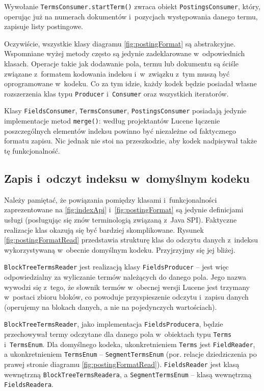 Wywołanie \texttt{TermsConsumer.startTerm()} zwraca obiekt \texttt{PostingsConsumer}, który, operując już na numerach dokumentów i~pozycjach występowania danego termu, zapisuje listy postingowe.

Oczywiście, wszystkie klasy diagramu \ref{fig:postingFormat} są abstrakcyjne. Wspomniane wyżej metody często są jedynie zadeklarowane w~odpowiednich klasach. Operacje takie jak dodawanie pola, termu lub dokumentu są ściśle związane z~formatem kodowania indeksu i~w~związku z~tym muszą być oprogramowane w~kodeku. Co za tym idzie, każdy kodek będzie posiadał własne rozszerzenia klas typu \texttt{Producer} i~\texttt{Consumer} oraz wszystkich iteratorów. 

Klasy \texttt{FieldsConsumer}, \texttt{TermsConsumer}, \texttt{PostingsConsumer} posiadają jedynie implementacje metod \texttt{merge()}: według projektantów Lucene łączenie poszczególnych elementów indeksu powinno być niezależne od faktycznego formatu zapisu. Nic jednak nie stoi na przeszkodzie, aby kodek nadpisywał także tę funkcjonalność.

\subsection{Zapis i~odczyt indeksu w~domyślnym kodeku}

Należy pamiętać, że powiązania pomiędzy klasami i~funkcjonalności zaprezentowane na \ref{fig:indexApi} i~\ref{fig:postingFormat} są jedynie definicjami usługi (posługując się znów terminologią związaną z~Java SPI). Faktyczne realizacje klas okazują się być bardziej skomplikowane. Rysunek \ref{fig:postingFormatRead} przedstawia strukturę klas do odczytu danych z~indeksu wykorzystywaną w~obecnie domyślnym kodeku. Przyjrzyjmy się jej bliżej.

\texttt{BlockTreeTermsReader} jest realizacją klasy \texttt{FieldsProducer} -- jest więc odpowiedzialny za wyliczanie termów należących do danego pola. Jego nazwa wywodzi się z~tego, że słownik termów w~obecnej wersji Lucene jest trzymany w~postaci zbioru bloków, co powoduje przyspieszenie odczytu i~zapisu danych (operujemy na blokach danych, a nie na pojedynczych wartościach). 

\texttt{BlockTreeTermsReader}, jako implementacja \texttt{FieldsProducera}, będzie przechowywał termy odczytane dla danego pola w~obiektach typu \texttt{Terms} i~\texttt{TermsEnum}. Dla domyślnego kodeka, ukonkretnieniem \texttt{Terms} jest \texttt{FieldReader}, a ukonkretnieniem \texttt{TermsEnum} -- \texttt{SegmentTermsEnum} (por. relacje dziedziczenia po prawej stronie diagramu \ref{fig:postingFormatRead}). \texttt{FieldsReader} jest klasą wewnętrzną \texttt{BlockTreeTermsReadera}, a \texttt{SegmentTermsEnum} -- klasą wewnętrzną \texttt{FieldsReadera}. 

